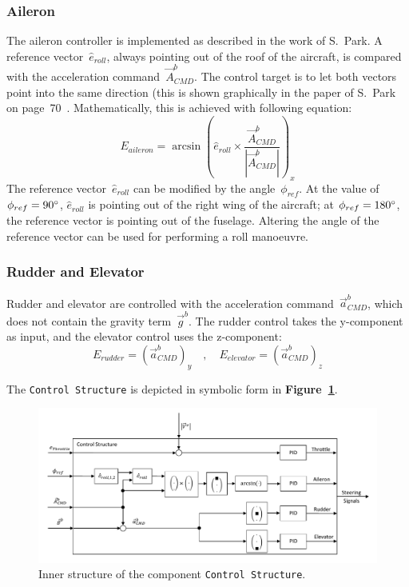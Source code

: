 \documentclass[11pt,a4paper]{scrartcl}		%
\begin{document}
\subsubsection*{Aileron}
The aileron controller is implemented as described in the work of S.~Park\cite[p.~71]{Park.2012}.
A reference vector~$\hat{e}_{roll}$, always pointing out of the roof of the aircraft, is compared with the acceleration command~$\vec{A}_{CMD}^b$. 
The control target is to let both vectors point into the same direction (this is shown graphically in the paper of S.~Park on page~70~\cite{Park.2012}.
Mathematically, this is achieved with following equation:
\begin{equation}
E_{aileron}=\arcsin\left(\hat{e}_{roll} \times \frac{\vec{A}_{CMD}^b}{|\vec{A}_{CMD}^b|}\right)_x
\end{equation}
The reference vector~$\hat{e}_{roll}$ can be modified by the angle~$\phi_{ref}$. At the value of $\phi_{ref}=90\degree$, $\hat{e}_{roll}$ is pointing out of the right wing of the aircraft; at $\phi_{ref}=180\degree$, the reference vector is pointing out of the fuselage.
Altering the angle of the reference vector can be used for performing a roll manoeuvre.

\subsubsection*{Rudder and Elevator}
Rudder and elevator are controlled with the acceleration command~$\vec{a}_{CMD}^b$, which does not contain the gravity term~$\vec{g}^b$.
The rudder control takes the y-component as input, and the elevator control uses the z-component:
\begin{equation}
E_{rudder}=(\vec{a}_{CMD}^b)_y\quad , \quad E_{elevator} = (\vec{a}_{CMD}^b)_z
\end{equation}

The \texttt{Control Structure} is depicted in symbolic form in \textbf{Figure~\ref{fig_Control-Structure}}.

\begin{figure}[tbh]
  \begin{center}
  	\includegraphics[width=15cm]{pictures/PID.pdf}
  \end{center}
  \caption{Inner structure of the component \texttt{Control Structure}.}
  \label{fig_Control-Structure}
\end{figure}
\end{document}
